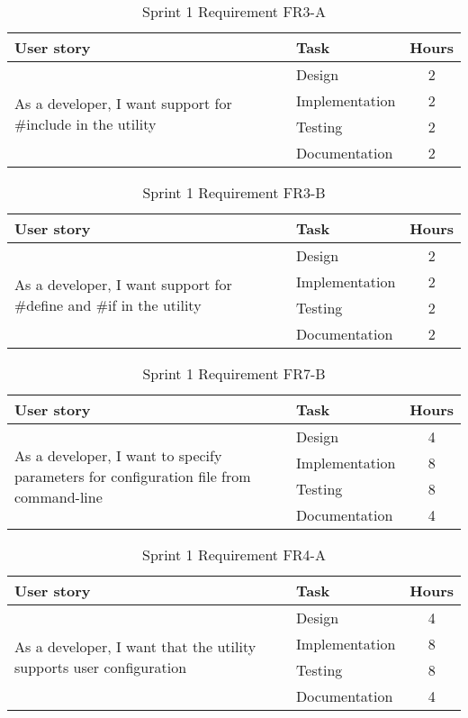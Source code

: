 \begin{table}[ht] \small \center
\caption{Sprint 1 Requirement FR3-A}
\begin{tabular}{l l c}
	\toprule
	User story & Task & Hours \\
	\midrule
	\multirow{4}{5cm}{ As a developer, I want support for \#include in the utility} & Design & 2 \\
	& Implementation & 2 \\
	& Testing & 2 \\
	& Documentation & 2 \\
	\bottomrule
\end{tabular}
\end{table}

\begin{table}[ht] \small \center
\caption{Sprint 1 Requirement FR3-B}
\begin{tabular}{l l c}
	\toprule
	User story & Task & Hours \\
	\midrule
	\multirow{4}{5cm}{As a developer, I want support for \#define and \#if in the utility} & Design & 2 \\
	& Implementation & 2 \\
	& Testing & 2 \\
	& Documentation & 2 \\
	\bottomrule
\end{tabular}
\end{table}

\begin{table}[ht] \small \center
\caption{Sprint 1 Requirement FR7-B}
\begin{tabular}{l l c}
	\toprule
	User story & Task & Hours \\
	\midrule
	\multirow{4}{5cm}{As a developer, I want to specify parameters for configuration file from command-line} & Design & 4 \\
	& Implementation & 8 \\
	& Testing & 8 \\
	& Documentation & 4 \\
	\bottomrule
\end{tabular}
\end{table}

\begin{table}[ht] \small \center
\caption{Sprint 1 Requirement FR4-A}
\begin{tabular}{l l c}
	\toprule
	User story & Task & Hours \\
	\midrule
	\multirow{4}{5cm}{As a developer, I want that the utility supports user configuration} & Design & 4 \\
	& Implementation & 8 \\
	& Testing & 8 \\
	& Documentation & 4 \\
	\bottomrule
\end{tabular}
\end{table}

